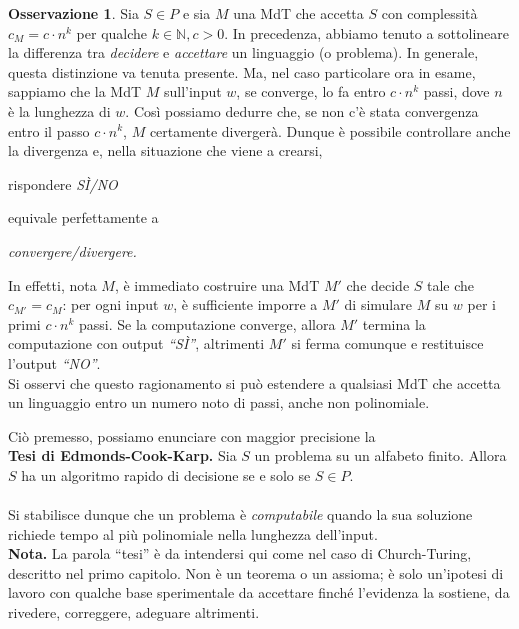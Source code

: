 \documentclass[12pt,a4paper]{report}
\theoremstyle{definition}
\newtheorem{oss}[teo]{Osservazione}  %
\begin{document}
\begin{oss}\label{decidere=accettare}
Sia $S \in P$ e sia $M$ una MdT che accetta $S$ con complessità $c_M = c \cdot n^k$ per qualche $k \in \mathbb{N}, c>0$. In precedenza, abbiamo tenuto a sottolineare la differenza tra \emph{decidere} e \emph{accettare} un linguaggio (o problema). In generale, questa distinzione va tenuta presente. Ma, nel caso particolare ora in esame, sappiamo che la MdT $M$ sull'input $w$, se converge, lo fa entro $c \cdot n^k$ passi, dove $n$ è la lunghezza di $w$. Così possiamo dedurre che, se non c'è stata convergenza entro il passo $c \cdot n^k$, $M$ certamente divergerà. Dunque è possibile controllare anche la divergenza e, nella situazione che viene a crearsi,\\
\centerline{rispondere \emph{SÌ/NO}}
equivale perfettamente a\\
\centerline{\emph{convergere/divergere.}}
In effetti, nota $M$, è immediato costruire una MdT $M'$ che decide $S$ tale che $c_{M'}=c_M$: per ogni input $w$, è sufficiente imporre a $M'$ di simulare $M$ su $w$ per i primi $c \cdot n^k$ passi. Se la computazione converge, allora $M'$ termina la computazione con output \emph{``SÌ''}, altrimenti $M'$ si ferma comunque e restituisce l'output \emph{``NO''}.\\
Si osservi che questo ragionamento si può estendere a qualsiasi MdT che accetta un linguaggio entro un numero noto di passi, anche non polinomiale.
\end{oss}

Ciò premesso, possiamo enunciare con maggior precisione la\\

\noindent \textbf{Tesi di Edmonds-Cook-Karp.} Sia $S$ un problema su un alfabeto finito. Allora $S$ ha un algoritmo rapido di decisione se e solo se $S \in P$.\\
\\
Si stabilisce dunque che un problema è \emph{computabile} quando la sua soluzione richiede tempo al più polinomiale nella lunghezza dell'input.\\
\noindent \textbf{Nota.} La parola ``tesi'' è da intendersi qui come nel caso di Church-Turing, descritto nel primo capitolo. Non è un teorema o un assioma; è solo un'ipotesi di lavoro con qualche base sperimentale da accettare finché l'evidenza la sostiene, da rivedere, correggere, adeguare altrimenti.\\
\end{document}
